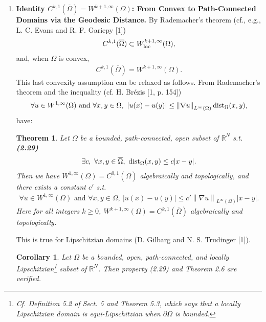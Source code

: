 \documentclass{book}
\numberwithin{equation}{section}
\newtheorem{corollary}{Corollary}[section]
\newtheorem{theorem}{Theorem}[section]
\begin{document}
\begin{enumerate}
    \item \textbf{Identity $C^{k,1}(\overline{\Omega}) = W^{k+1,\infty}(\Omega)$: From Convex to Path-Connected Domains via the Geodesic Distance.} By Rademacher's theorem (cf., e.g., L. C. Evans and R. F. Gariepy [1])
    \begin{align*}
        C^{k,1}(\overline{\Omega})\subset W_{\rm loc}^{k+1,\infty}(\Omega),
    \end{align*}
    and, when $\Omega$ is convex,
    \begin{align*}
        C^{k,1}(\overline{\Omega}) = W^{k+1,\infty}(\Omega).
    \end{align*}
    This last convexity assumption can be relaxed as follows. From Rademacher's theorem and the inequality (cf. H. Brézis [1, p. 154])
    \begin{align*}
        \forall u\in W^{1,\infty}(\Omega) \mbox{ and } \forall x,y\in\Omega,\ \left|u(x) - u(y)\right|\le\left\|\nabla u\right\|_{L^\infty(\Omega)}{\rm dist}_\Omega(x,y),
    \end{align*}
    have:
    
    \begin{theorem}
        Let $\Omega$ be a bounded, path-connected, open subset of $\mathbb{R}^N$ s.t. \textbf{(2.29)}
        \begin{align*}
            \exists c,\ \forall x,y\in\overline{\Omega},\ {\rm dist}_\Omega(x,y)\le c|x - y|.
        \end{align*}
        Then we have $W^{1,\infty}(\Omega) = C^{0,1}(\overline{\Omega})$ algebraically and topologically, and there exists a constant $c'$ s.t.
        \begin{align*}
            \forall u\in W^{1,\infty}(\Omega) \mbox{ and } \forall x,y\in\overline{\Omega},\ \left|u(x) - u(y)\right|\le c'\left\|\nabla u\right\|_{L^\infty(\Omega)}\left|x - y\right|.
        \end{align*}
        Here for all integers $k\ge 0$, $W^{k+1,\infty}(\Omega) = C^{k,1}(\overline{\Omega})$ algebraically and topologically.
    \end{theorem} 
    This is true for Lipschitzian domains (D. Gilbarg and N. S. Trudinger [1]).
    
    \begin{corollary}
        Let $\Omega$ be a bounded, open, path-connected, and locally Lipschitzian\footnote{Cf. Definition 5.2 of Sect. 5 and Theorem 5.3, which says that a locally Lipschitzian domain is equi-Lipschitzian when $\partial\Omega$ is bounded.} subset of $\mathbb{R}^N$. Then property (2.29) and Theorem 2.6 are verified.
    \end{corollary}
\end{enumerate}
\end{document}
